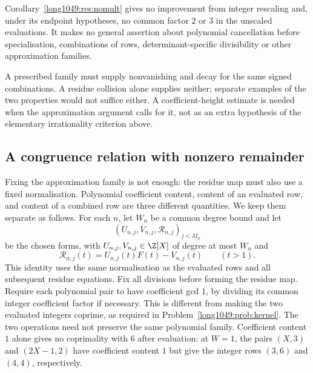 Corollary~\ref{long1049:res:nomult} gives no improvement from integer
rescaling and, under its endpoint hypotheses, no common factor $2$ or
$3$ in the unscaled evaluations. It makes no general assertion about
polynomial cancellation before specialisation, combinations of rows,
determinant-specific divisibility or other approximation families.

A prescribed family must supply nonvanishing and decay for the same
signed combinations. A residue collision alone supplies neither;
separate examples of the two properties would not suffice either.
A coefficient-height estimate is needed when the approximation
argument calls for it, not as an extra hypothesis of the elementary
irrationality criterion above.

\subsection{A congruence relation with nonzero remainder}

Fixing the approximation family is not enough: the residue map
must also use a fixed normalisation. Polynomial coefficient content,
content of an evaluated row, and content of a combined row are
three different quantities. We keep them separate as follows.
For each $n$, let $W_n$ be a common degree bound and let
\[
 (U_{n,j},V_{n,j},\mathcal R_{n,j})_{j<M_n}
\]
be the chosen forms, with $U_{n,j},V_{n,j}\in\Z[X]$ of degree at most
$W_n$ and
\[
 \mathcal R_{n,j}(t)=U_{n,j}(t)F(t)-V_{n,j}(t)\qquad(t>1).
\]
This identity uses the same normalisation as the evaluated rows and
all subsequent residue equations. Fix all divisions before forming the
residue map. Require each
polynomial pair to have coefficient gcd $1$, by dividing its common
integer coefficient factor if necessary. This is different from making
the two evaluated integers coprime, as required in
Problem~\ref{long1049:prob:kernel}. The two operations need not preserve
the same polynomial family. Coefficient content $1$ alone gives no
coprimality with $6$ after evaluation: at $W=1$, the pairs $(X,3)$
and $(2X-1,2)$ have coefficient content $1$ but give the integer rows
$(3,6)$ and $(4,4)$, respectively.

